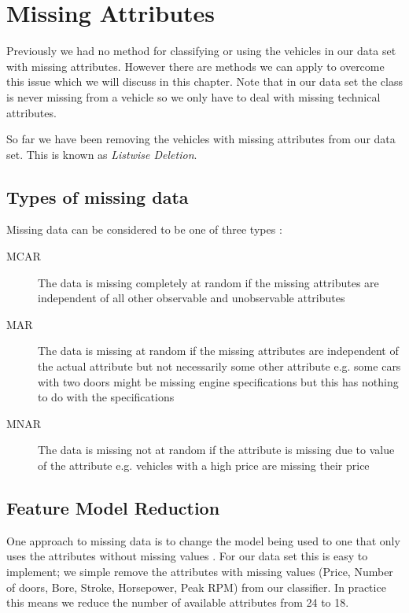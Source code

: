 \chapter{Missing Attributes}

Previously we had no method for classifying or using the vehicles in our data set with missing attributes.
However there are methods we can apply to overcome this issue which we will discuss in this chapter.
Note that in our data set the class is never missing from a vehicle so we only have to deal with missing technical attributes.

So far we have been removing the vehicles with missing attributes from our data set.
This is known as \textit{Listwise Deletion}.

\section{Types of missing data}

Missing data can be considered to be one of three types \cite{Olinsky02}:
\begin{description}
	\item[MCAR] The data is missing completely at random if the missing attributes are independent of all other observable and unobservable attributes
	\item[MAR] The data is missing at random if the missing attributes are independent of the actual attribute but not necessarily some other attribute e.g. some cars with two doors might be missing engine specifications but this has nothing to do with the specifications
	\item[MNAR] The data is missing not at random if the attribute is missing due to value of the attribute e.g. vehicles with a high price are missing their price
\end{description}

\section{Feature Model Reduction}

One approach to missing data is to change the model being used to one that only uses the attributes without missing values \cite{Saar-Tsechansky07}.
For our data set this is easy to implement; we simple remove the attributes with missing values (Price, Number of doors, Bore, Stroke, Horsepower, Peak RPM) from our classifier.
In practice this means we reduce the number of available attributes from 24 to 18.

